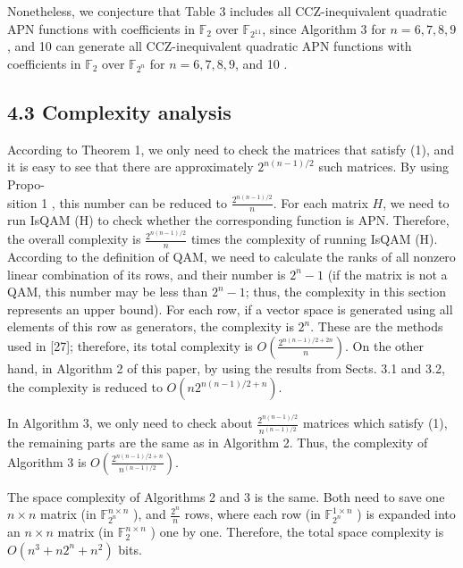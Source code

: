 \documentclass[10pt]{article}
\begin{document}
Nonetheless, we conjecture that Table 3 includes all CCZ-inequivalent quadratic APN functions with coefficients in $\mathbb{F}_{2}$ over $\mathbb{F}_{2^{11}}$, since Algorithm 3 for $n=6,7,8,9$, and 10 can generate all CCZ-inequivalent quadratic APN functions with coefficients in $\mathbb{F}_{2}$ over $\mathbb{F}_{2^{n}}$ for $n=6,7,8,9$, and 10 .

\subsection*{4.3 Complexity analysis}
According to Theorem 1, we only need to check the matrices that satisfy (1), and it is easy to see that there are approximately $2^{n(n-1) / 2}$ such matrices. By using Propo-\\
sition 1 , this number can be reduced to $\frac{2^{n(n-1) / 2}}{n}$. For each matrix $H$, we need to run IsQAM (H) to check whether the corresponding function is APN. Therefore, the overall complexity is $\frac{2^{n(n-1) / 2}}{n}$ times the complexity of running IsQAM (H). According to the definition of QAM, we need to calculate the ranks of all nonzero linear combination of its rows, and their number is $2^{n}-1$ (if the matrix is not a QAM, this number may be less than $2^{n}-1$; thus, the complexity in this section represents an upper bound). For each row, if a vector space is generated using all elements of this row as generators, the complexity is $2^{n}$. These are the methods used in [27]; therefore, its total complexity is $O\left(\frac{2^{n(n-1) / 2+2 n}}{n}\right)$. On the other hand, in Algorithm 2 of this paper, by using the results from Sects. 3.1 and 3.2, the complexity is reduced to $O\left(n 2^{n(n-1) / 2+n}\right)$.

In Algorithm 3, we only need to check about $\frac{2^{n(n-1) / 2}}{n^{(n-1) / 2}}$ matrices which satisfy (1), the remaining parts are the same as in Algorithm 2. Thus, the complexity of Algorithm 3 is $O\left(\frac{2^{n(n-1) / 2+n}}{n^{(n-1) / 2}}\right)$.

The space complexity of Algorithms 2 and 3 is the same. Both need to save one $n \times n$ matrix (in $\mathbb{F}_{2^{n}}^{n \times n}$ ), and $\frac{2^{n}}{n}$ rows, where each row (in $\mathbb{F}_{2^{n}}^{1 \times n}$ ) is expanded into an $n \times n$ matrix (in $\mathbb{F}_{2}^{n \times n}$ ) one by one. Therefore, the total space complexity is $O\left(n^{3}+n 2^{n}+n^{2}\right)$ bits.
\end{document}
